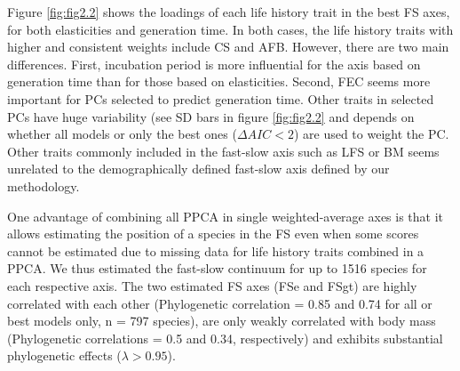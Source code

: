 Figure \ref{fig:fig2.2} shows the loadings of each life history trait in the 
best
FS axes, for both elasticities and generation time. In both cases, the life 
history traits with higher and consistent weights include CS and AFB. 
However, there are two main differences. First, incubation period is more 
influential for the axis based on generation time than for those based on 
elasticities. Second, FEC seems more important for PCs selected to 
predict generation time. Other traits in selected PCs have huge variability 
(see SD bars in figure \ref{fig:fig2.2} and depends on whether all models or 
only the best ones ($\Delta AIC < 2$) are used to weight the PC. Other traits 
commonly included in the fast-slow axis such as LFS or BM seems unrelated to 
the demographically defined fast-slow axis defined by our methodology.

One advantage of combining all PPCA in single weighted-average axes is that it 
allows estimating the position of a species in the FS even when some scores 
cannot be estimated due to missing data for life history traits combined in a 
PPCA. We thus estimated the fast-slow continuum for up to 1516 species for each 
respective axis. The two 
estimated FS axes (FSe and FSgt) are highly correlated with each other 
(Phylogenetic correlation =  0.85 and 0.74 for all or best models 
only, n = 797 species), are only weakly correlated 
with body mass (Phylogenetic correlations = 0.5 and 0.34, respectively) and 
exhibits substantial phylogenetic effects ($\lambda > 0.95$).

